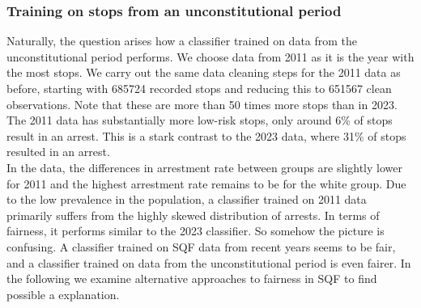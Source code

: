 \subsubsection*{Training on stops from an unconstitutional period}
Naturally, the question arises how a classifier trained on data from the unconstitutional period performs.
We choose data from 2011 as it is the year with the most stops. We carry out the same data cleaning steps for the 2011 data as before, starting with 685724 recorded stops and reducing this to 651567 clean observations. Note that these are more than 50 times more stops than in 2023.
The 2011 data has substantially more low-risk stops, only around 6\% of stops result in an arrest. This is a stark contrast to the 2023 data, where 31\% of stops resulted in an arrest.\\
In the data, the differences in arrestment rate between groups are slightly lower for 2011 and the highest arrestment rate remains to be for the white group.
Due to the low prevalence in the population, a classifier trained on 2011 data primarily suffers from the highly skewed distribution of arrests. In terms of fairness, it performs similar to the 2023 classifier.
So somehow the picture is confusing. A classifier trained on SQF data from recent years seems to be fair, and a classifier trained on data from the unconstitutional period is even fairer. In the following we examine alternative approaches to fairness in SQF to find possible a explanation.




